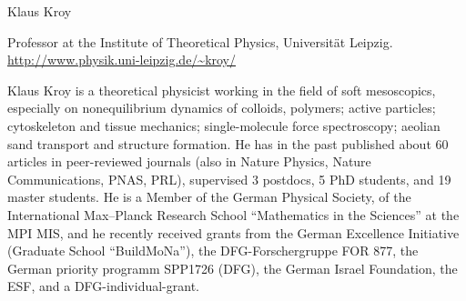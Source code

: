 \begin{participant}[type=leadPI,PM=12,gender=male,salary=5500]{Klaus Kroy}

Professor at the Institute of Theoretical Physics, Universität Leipzig. \url{http://www.physik.uni-leipzig.de/~kroy/}

Klaus Kroy is a theoretical physicist working in the field of soft mesoscopics, especially on nonequilibrium dynamics 
of colloids, polymers; active particles; cytoskeleton and tissue mechanics; single-molecule force spectroscopy; 
aeolian sand transport and structure formation. He has in the past published about 60 articles in peer-reviewed journals 
(also in Nature Physics, Nature Communications, PNAS, PRL), supervised 3 postdocs, 5 PhD students, and 19 master students. 
He is a Member of the German Physical Society, of the International Max--Planck Research School ``Mathematics in the Sciences''
at the MPI MIS, and he recently received grants from the German Excellence Initiative (Graduate School ``BuildMoNa''),
the DFG-Forschergruppe FOR 877, the German priority programm SPP1726 (DFG), the German Israel Foundation, the ESF, 
and a DFG-individual-grant.

\end{participant}
